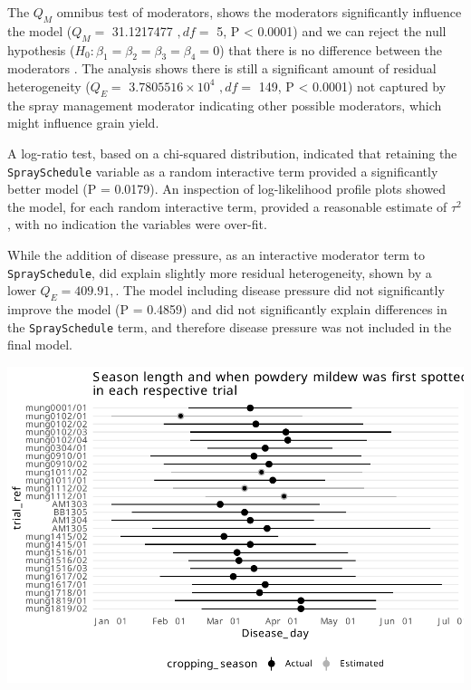 \documentclass[agronomy,article,submit,moreauthors,pdftex]{mdpi}
\begin{document}
The \(Q_M\) omnibus test of moderators, shows the moderators significantly influence the model (\(Q_M =\) 31.1217477 \(,df =\) 5, P \textless{} 0.0001) and we can reject the null hypothesis (\(H_0 : \beta_1 = \beta_2 = \beta_3 =\beta_4 = 0\)) that there is no difference between the moderators \citep{Viechtbauer2010}.
The analysis shows there is still a significant amount of residual heterogeneity (\(Q_E =\) \ensuremath{3.7805516\times 10^{4}} \(,df=\) 149, P \textless{} 0.0001) not captured by the spray management moderator indicating other possible moderators, which might influence grain yield.

A log-ratio test, based on a chi-squared distribution, indicated that retaining the \texttt{SpraySchedule} variable as a random interactive term provided a significantly better model (P = 0.0179).
An inspection of log-likelihood profile plots showed the model, for each random interactive term, provided a reasonable estimate of \(\tau^2\), with no indication the variables were over-fit.

While the addition of disease pressure, as an interactive moderator term to \texttt{SpraySchedule}, did explain slightly more residual heterogeneity, shown by a lower \(Q_E = 409.91,\).
The model including disease pressure did not significantly improve the model (P = 0.4859) and did not significantly explain differences in the \texttt{SpraySchedule} term, and therefore disease pressure was not included in the final model.

\includegraphics{paper_files/figure-latex/Figure2-1.pdf}
\end{document}
